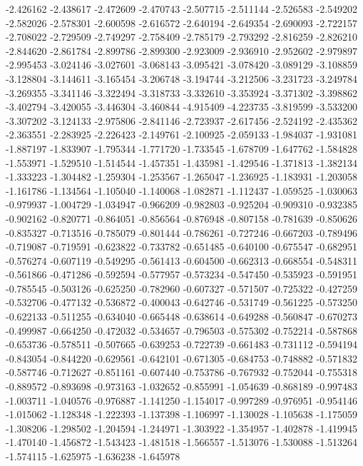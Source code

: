 -2.426162
-2.438617
-2.472609
-2.470743
-2.507715
-2.511144
-2.526583
-2.549202
-2.582026
-2.578301
-2.600598
-2.616572
-2.640194
-2.649354
-2.690093
-2.722157
-2.708022
-2.729509
-2.749297
-2.758409
-2.785179
-2.793292
-2.816259
-2.826210
-2.844620
-2.861784
-2.899786
-2.899300
-2.923009
-2.936910
-2.952602
-2.979897
-2.995453
-3.024146
-3.027601
-3.068143
-3.095421
-3.078420
-3.089129
-3.108859
-3.128804
-3.144611
-3.165454
-3.206748
-3.194744
-3.212506
-3.231723
-3.249784
-3.269355
-3.341146
-3.322494
-3.318733
-3.332610
-3.353924
-3.371302
-3.398862
-3.402794
-3.420055
-3.446304
-3.460844
-4.915409
-4.223735
-3.819599
-3.533200
-3.307202
-3.124133
-2.975806
-2.841146
-2.723937
-2.617456
-2.524192
-2.435362
-2.363551
-2.283925
-2.226423
-2.149761
-2.100925
-2.059133
-1.984037
-1.931081
-1.887197
-1.833907
-1.795344
-1.771720
-1.733545
-1.678709
-1.647762
-1.584828
-1.553971
-1.529510
-1.514544
-1.457351
-1.435981
-1.429546
-1.371813
-1.382134
-1.333223
-1.304482
-1.259304
-1.253567
-1.265047
-1.236925
-1.183931
-1.203058
-1.161786
-1.134564
-1.105040
-1.140068
-1.082871
-1.112437
-1.059525
-1.030063
-0.979937
-1.004729
-1.034947
-0.966209
-0.982803
-0.925204
-0.909310
-0.932385
-0.902162
-0.820771
-0.864051
-0.856564
-0.876948
-0.807158
-0.781639
-0.850626
-0.835327
-0.713516
-0.785079
-0.801444
-0.786261
-0.727246
-0.667203
-0.789496
-0.719087
-0.719591
-0.623822
-0.733782
-0.651485
-0.640100
-0.675547
-0.682951
-0.576274
-0.607119
-0.549295
-0.561413
-0.604500
-0.662313
-0.668554
-0.548311
-0.561866
-0.471286
-0.592594
-0.577957
-0.573234
-0.547450
-0.535923
-0.591951
-0.785545
-0.503126
-0.625250
-0.782960
-0.607327
-0.571507
-0.725322
-0.427259
-0.532706
-0.477132
-0.536872
-0.400043
-0.642746
-0.531749
-0.561225
-0.573250
-0.622133
-0.511255
-0.634040
-0.665448
-0.638614
-0.649288
-0.560847
-0.670273
-0.499987
-0.664250
-0.472032
-0.534657
-0.796503
-0.575302
-0.752214
-0.587868
-0.653736
-0.578511
-0.507665
-0.639253
-0.722739
-0.661483
-0.731112
-0.594194
-0.843054
-0.844220
-0.629561
-0.642101
-0.671305
-0.684753
-0.748882
-0.571832
-0.587746
-0.712627
-0.851161
-0.607440
-0.753786
-0.767932
-0.752044
-0.755318
-0.889572
-0.893698
-0.973163
-1.032652
-0.855991
-1.054639
-0.868189
-0.997483
-1.003711
-1.040576
-0.976887
-1.141250
-1.154017
-0.997289
-0.976951
-0.954146
-1.015062
-1.128348
-1.222393
-1.137398
-1.106997
-1.130028
-1.105638
-1.175059
-1.308206
-1.298502
-1.204594
-1.244971
-1.303922
-1.354957
-1.402878
-1.419945
-1.470140
-1.456872
-1.543423
-1.481518
-1.566557
-1.513076
-1.530088
-1.513264
-1.574115
-1.625975
-1.636238
-1.645978
